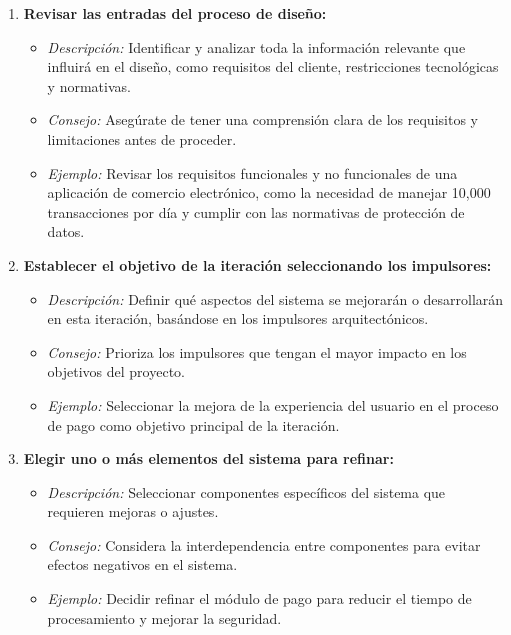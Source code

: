 \begin{enumerate}
    \item \textbf{Revisar las entradas del proceso de diseño:} 
    \begin{itemize}
        \item \textit{Descripción:} Identificar y analizar toda la información relevante que influirá en el diseño, como requisitos del cliente, restricciones tecnológicas y normativas.
        \item \textit{Consejo:} Asegúrate de tener una comprensión clara de los requisitos y limitaciones antes de proceder.
        \item \textit{Ejemplo:} Revisar los requisitos funcionales y no funcionales de una aplicación de comercio electrónico, como la necesidad de manejar 10,000 transacciones por día y cumplir con las normativas de protección de datos.
    \end{itemize}
    
    \item \textbf{Establecer el objetivo de la iteración seleccionando los impulsores:}
    \begin{itemize}
        \item \textit{Descripción:} Definir qué aspectos del sistema se mejorarán o desarrollarán en esta iteración, basándose en los impulsores arquitectónicos.
        \item \textit{Consejo:} Prioriza los impulsores que tengan el mayor impacto en los objetivos del proyecto.
        \item \textit{Ejemplo:} Seleccionar la mejora de la experiencia del usuario en el proceso de pago como objetivo principal de la iteración.
    \end{itemize}
    
    \item \textbf{Elegir uno o más elementos del sistema para refinar:}
    \begin{itemize}
        \item \textit{Descripción:} Seleccionar componentes específicos del sistema que requieren mejoras o ajustes.
        \item \textit{Consejo:} Considera la interdependencia entre componentes para evitar efectos negativos en el sistema.
        \item \textit{Ejemplo:} Decidir refinar el módulo de pago para reducir el tiempo de procesamiento y mejorar la seguridad.
    \end{itemize}
    

\end{enumerate}
